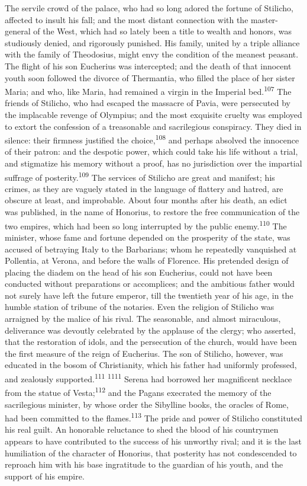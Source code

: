 The servile crowd of the palace, who had so long adored the
fortune of Stilicho, affected to insult his fall; and the most
distant connection with the master-general of the West, which had
so lately been a title to wealth and honors, was studiously
denied, and rigorously punished. His family, united by a triple
alliance with the family of Theodosius, might envy the condition
of the meanest peasant. The flight of his son Eucherius was
intercepted; and the death of that innocent youth soon followed
the divorce of Thermantia, who filled the place of her sister
Maria; and who, like Maria, had remained a virgin in the Imperial
bed.\textsuperscript{107} The friends of Stilicho, who had escaped the massacre of
Pavia, were persecuted by the implacable revenge of Olympius; and
the most exquisite cruelty was employed to extort the confession
of a treasonable and sacrilegious conspiracy. They died in
silence: their firmness justified the choice,\textsuperscript{108} and perhaps
absolved the innocence of their patron: and the despotic power,
which could take his life without a trial, and stigmatize his
memory without a proof, has no jurisdiction over the impartial
suffrage of posterity.\textsuperscript{109} The services of Stilicho are great and
manifest; his crimes, as they are vaguely stated in the language
of flattery and hatred, are obscure at least, and improbable.
About four months after his death, an edict was published, in the
name of Honorius, to restore the free communication of the two
empires, which had been so long interrupted by the public enemy.\textsuperscript{110}
The minister, whose fame and fortune depended on the
prosperity of the state, was accused of betraying Italy to the
Barbarians; whom he repeatedly vanquished at Pollentia, at
Verona, and before the walls of Florence. His pretended design of
placing the diadem on the head of his son Eucherius, could not
have been conducted without preparations or accomplices; and the
ambitious father would not surely have left the future emperor,
till the twentieth year of his age, in the humble station of
tribune of the notaries. Even the religion of Stilicho was
arraigned by the malice of his rival. The seasonable, and almost
miraculous, deliverance was devoutly celebrated by the applause
of the clergy; who asserted, that the restoration of idols, and
the persecution of the church, would have been the first measure
of the reign of Eucherius. The son of Stilicho, however, was
educated in the bosom of Christianity, which his father had
uniformly professed, and zealously supported.\textsuperscript{111} \textsuperscript{1111} Serena had
borrowed her magnificent necklace from the statue of Vesta;\textsuperscript{112}
and the Pagans execrated the memory of the sacrilegious minister,
by whose order the Sibylline books, the oracles of Rome, had been
committed to the flames.\textsuperscript{113} The pride and power of Stilicho
constituted his real guilt. An honorable reluctance to shed the
blood of his countrymen appears to have contributed to the
success of his unworthy rival; and it is the last humiliation of
the character of Honorius, that posterity has not condescended to
reproach him with his base ingratitude to the guardian of his
youth, and the support of his empire.

